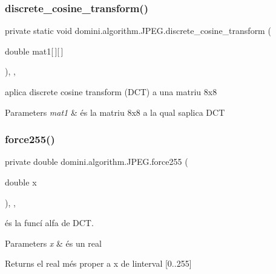 \subsubsection{\texorpdfstring{discrete\+\_\+cosine\+\_\+transform()}{discrete\_cosine\_transform()}}
{\footnotesize\ttfamily private static void domini.\+algorithm.\+J\+P\+E\+G.\+discrete\+\_\+cosine\+\_\+transform (\begin{DoxyParamCaption}\item[{double}]{mat1\mbox{[}$\,$\mbox{]}\mbox{[}$\,$\mbox{]} }\end{DoxyParamCaption})\hspace{0.3cm}{\ttfamily [inline]}, {\ttfamily [static]}, {\ttfamily [private]}}



aplica discrete cosine transform (D\+CT) a una matriu 8x8 


\begin{DoxyParams}{Parameters}
{\em mat1} & és la matriu 8x8 a la qual s\textquotesingle{}aplica D\+CT \\
\hline
\end{DoxyParams}
\mbox{\label{classdomini_1_1algorithm_1_1JPEG_af86bdbb6b6f5671abff6bc6bd5f6349d}} 
\subsubsection{\texorpdfstring{force255()}{force255()}}
{\footnotesize\ttfamily private double domini.\+algorithm.\+J\+P\+E\+G.\+force255 (\begin{DoxyParamCaption}\item[{double}]{x }\end{DoxyParamCaption})\hspace{0.3cm}{\ttfamily [inline]}, {\ttfamily [static]}, {\ttfamily [private]}}



és la funcí alfa de D\+CT. 


\begin{DoxyParams}{Parameters}
{\em x} & és un real \\
\hline
\end{DoxyParams}
\begin{DoxyReturn}{Returns}
el real més proper a x de l\textquotesingle{}interval \mbox{[}0..255\mbox{]} 
\end{DoxyReturn}
\mbox{\label{classdomini_1_1algorithm_1_1JPEG_ac58cb434a7acfd90fc8e548fd7c00ae2}} 
